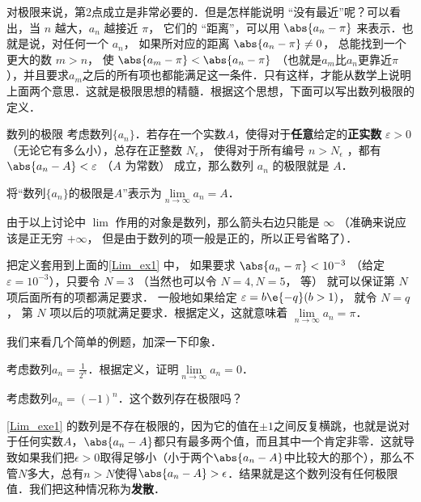 对极限来说，第2点成立是非常必要的．但是怎样能说明 “没有最近”呢？可以看出，当 $n$ 越大，$a_n$ 越接近 $\pi$， 它们的 “距离”，可以用 $\abs{a_n - \pi}$ 来表示．也就是说，对任何一个 $a_n$， 如果所对应的距离 $\abs{a_n - \pi } \ne 0$， 总能找到一个更大的数 $m>n$， 使 $\abs{a_m - \pi} < \abs{a_n - \pi}$ （也就是$a_m$比$a_n$更靠近$\pi$），并且要求$a_m$之后的所有项也都能满足这一条件．只有这样，才能从数学上说明上面两个意思．这就是极限思想的精髓．根据这个思想，下面可以写出数列极限的定义．



\begin{definition}{数列的极限}\label{Lim_def2}
考虑数列$\{a_n\}$．若存在一个实数$A$，使得对于\textbf{任意}给定的\textbf{正实数} $\varepsilon > 0$（无论它有多么小），总存在正整数 $N_\epsilon$， 使得对于所有编号 $n>N_\epsilon$ ，都有 $\abs{a_n - A} < \varepsilon$ （$A$ 为常数） 成立，那么数列 $a_n$ 的极限就是 $A$．

将“数列$\{a_n\}$的极限是$A$”表示为$\lim\limits_{n\to\infty}a_n=A$．
\end{definition}
 


由于以上讨论中 $\lim$ 作用的对象是数列，那么箭头右边只能是 $\infty$ （准确来说应该是正无穷 $+\infty$， 但是由于数列的项一般是正的，所以正号省略了）．

把定义套用到上面的\autoref{Lim_ex1} 中， 如果要求 $\abs{a_n - \pi} < 10^{-3}$ （给定 $\varepsilon  = 10^{-3}$），只要令 $N=3$ （当然也可以令 $N=4, N=5$， 等） 就可以保证第 $N$ 项后面所有的项都满足要求． 一般地如果给定 $\varepsilon  = b\e{-q}  (b > 1)$， 就令 $N = q$， 第 $N$ 项以后的项就满足要求．根据定义，这就意味着 $\lim\limits_{n \to \infty } a_n = \pi$． 

我们来看几个简单的例题，加深一下印象．

\begin{exercise}{}
考虑数列$a_n=\frac{1}{2^n}$．根据定义，证明$\lim\limits_{n\to\infty}a_n=0$．
\end{exercise}

\begin{exercise}{}\label{Lim_exe1}
考虑数列$a_n=(-1)^n$．这个数列存在极限吗？
\end{exercise}

\autoref{Lim_exe1} 的数列是不存在极限的，因为它的值在$\pm 1$之间反复横跳，也就是说对于任何实数$A$，$\abs{a_n-A}$都只有最多两个值，而且其中一个肯定非零．这就导致如果我们把$\epsilon>0$取得足够小（小于两个$\abs{a_n-A}$中比较大的那个），那么不管$N$多大，总有$n>N$使得$\abs{a_n-A}>\epsilon$．结果就是这个数列没有任何极限值．我们把这种情况称为\textbf{发散}．

